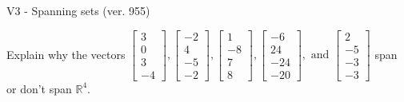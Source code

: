 \begin{exercise}
  \begin{exerciseTitle}V3 - Spanning sets (ver. 955)\end{exerciseTitle}
  \begin{exerciseStatement}
    Explain why the vectors \(\left[\begin{array}{r}
3 \\
0 \\
3 \\
-4
\end{array}\right] , \left[\begin{array}{r}
-2 \\
4 \\
-5 \\
-2
\end{array}\right] , \left[\begin{array}{r}
1 \\
-8 \\
7 \\
8
\end{array}\right] , \left[\begin{array}{r}
-6 \\
24 \\
-24 \\
-20
\end{array}\right] , \text{ and } \left[\begin{array}{r}
2 \\
-5 \\
-3 \\
-3
\end{array}\right]\) span or don't span \(\mathbb{R}^4\). 
	



\end{exerciseStatement}
\end{exercise}
